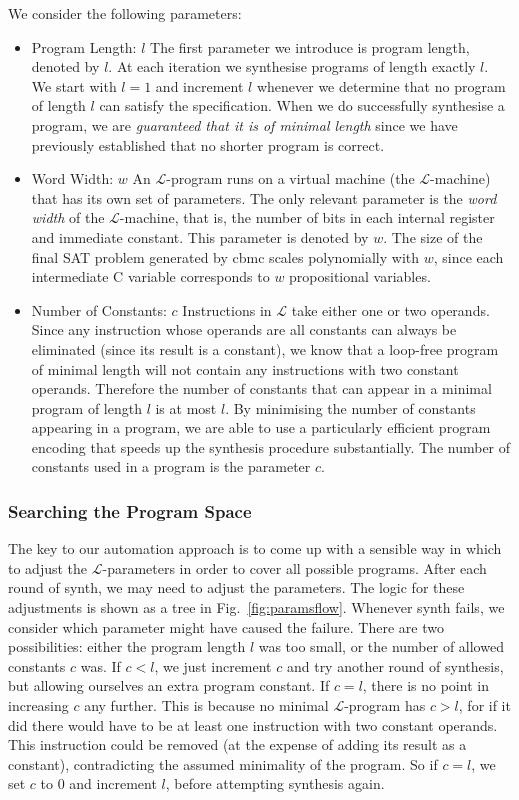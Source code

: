 \documentclass[preprint]{sigplanconf}
\theoremstyle{definition}
\begin{document}
We consider the following parameters:
\begin{itemize}
\item{Program Length: $l$}
The first parameter we introduce is program length, denoted by $l$.
At each iteration we synthesise programs of length exactly $l$.
We start with $l = 1$ and increment $l$ whenever we determine
that no program of length $l$ can satisfy the specification.  When we do
successfully synthesise a program, we are \emph{guaranteed that it
is of minimal length} since we have previously established that no
shorter program is correct.
\item{Word Width: $w$}
An $\mathcal{L}$-program runs on a virtual machine (the $\mathcal{L}$-machine) that
has its own set of parameters.  The only relevant parameter is
the \emph{word width} of the $\mathcal{L}$-machine, that is, the number of bits
in each internal register and immediate constant.  This parameter is denoted by
$w$.  The size of the final SAT problem generated by {\sc cbmc} scales
polynomially with $w$, since each intermediate C variable corresponds
to $w$ propositional variables.


\item{Number of Constants: $c$}
Instructions in $\mathcal{L}$ take either one or two operands.
Since any instruction whose operands are all constants can always be
eliminated (since its result is a constant), we know that a loop-free program
of minimal length will not contain any instructions with two constant
operands.  Therefore the number of constants that can appear in
a minimal program of length $l$ is at most $l$.  By minimising the number
of constants appearing in a program, we are able to use a particularly
efficient program encoding that speeds up the synthesis procedure
substantially.  The number of constants used in a program is the parameter $c$.

\end{itemize}
\subsubsection{Searching the Program Space}

The key to our automation approach is to come up with a sensible way in which to
adjust the $\mathcal{L}$-parameters in order to cover all possible programs.
After each round of {\sc synth}, we may need to adjust the parameters.  
The
logic for these adjustments is shown as a tree in Fig.~\ref{fig:paramsflow}.
Whenever {\sc synth} fails, we consider which parameter might have caused the
failure.  
There are two possibilities: either the program length $l$ was too small,
or the number of allowed constants $c$ was.  If $c < l$, we just increment $c$ and
try another round of synthesis, but allowing ourselves an extra program constant.
If $c = l$, there is no point in increasing $c$ any further.  This is because
no minimal $\mathcal{L}$-program has $c > l$, for if it did there would
have to be at least one instruction with two constant operands.  This
instruction could be removed (at the expense of adding its result as
a constant), contradicting the assumed minimality of the program.  So
if $c = l$, we set $c$ to 0 and increment $l$, before attempting
synthesis again.
\end{document}
